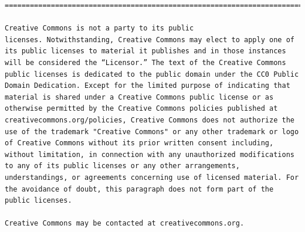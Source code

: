 \documentclass[12pt,spanish,]{scrartcl}
\begin{document}
\begin{verbatim}
=======================================================================

Creative Commons is not a party to its public
licenses. Notwithstanding, Creative Commons may elect to apply one of
its public licenses to material it publishes and in those instances
will be considered the “Licensor.” The text of the Creative Commons
public licenses is dedicated to the public domain under the CC0 Public
Domain Dedication. Except for the limited purpose of indicating that
material is shared under a Creative Commons public license or as
otherwise permitted by the Creative Commons policies published at
creativecommons.org/policies, Creative Commons does not authorize the
use of the trademark "Creative Commons" or any other trademark or logo
of Creative Commons without its prior written consent including,
without limitation, in connection with any unauthorized modifications
to any of its public licenses or any other arrangements,
understandings, or agreements concerning use of licensed material. For
the avoidance of doubt, this paragraph does not form part of the
public licenses.

Creative Commons may be contacted at creativecommons.org.
\end{verbatim}
\end{document}
